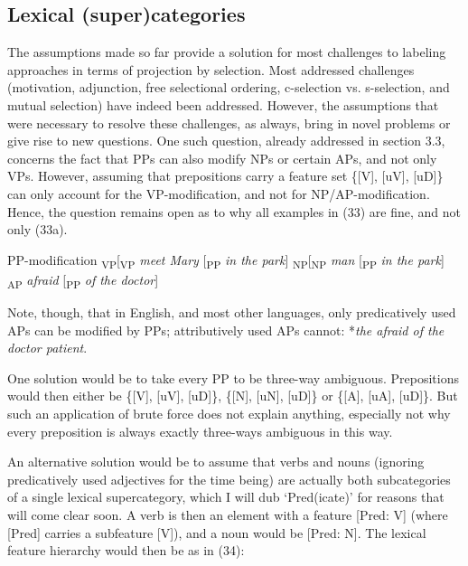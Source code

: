 \documentclass[output=paper
,modfonts
,nonflat]{langsci/langscibook}
\begin{document}
\subsection{Lexical (super)categories}
The assumptions made so far provide a solution for most challenges to labeling approaches in terms of projection by selection. Most addressed challenges (motivation, adjunction, free selectional ordering, c-selection vs. s-selection, and mutual selection) have indeed been addressed. However, the assumptions that were necessary to resolve these challenges, as always, bring in novel problems or give rise to new questions. One such question, already addressed in section 3.3, concerns the fact that PPs can also modify NPs or certain APs, and not only VPs. However, assuming that prepositions carry a feature set \{[V], [uV], [uD]\} can only account for the VP-modification, and not for NP/AP-modification. Hence, the question remains open as to why all examples in (33) are fine, and not only (33a). 

\begin{exe}
\ex PP-modification
	\xlist
	\ex {\lbrack}\textsubscript{VP}[\textsubscript{VP} \textit{meet Mary} [\textsubscript{PP} \textit{in the park}]{\rbrack}
	\ex {\lbrack}\textsubscript{NP}[\textsubscript{NP} \textit{man} [\textsubscript{PP} \textit{in the park}]{\rbrack}
	\ex {\lbrack}\textsubscript{AP} \textit{afraid} [\textsubscript{PP} \textit{of the doctor}]{\rbrack}
	\endxlist
\end{exe}
Note, though, that in English, and most other languages, only predicatively used APs can be modified by PPs; attributively used APs cannot: *\textit{the afraid of the doctor patient}.

One solution would be to take every PP to be three-way ambiguous. Prepositions would then either be \{[V], [uV], [uD]\}, \{[N], [uN], [uD]\} or \{[A], [uA], [uD]\}. But such an application of brute force does not explain anything, especially not why every preposition is always exactly three-ways ambiguous in this way.

An alternative solution would be to assume that verbs and nouns (ignoring predicatively used adjectives for the time being) are actually both subcategories of a single lexical supercategory, which I will dub ‘Pred(icate)’ for reasons that will come clear soon. A verb is then an element with a feature [Pred: V] (where [Pred] carries a subfeature [V]), and a noun would be [Pred: N]. The lexical feature hierarchy would then be as in (34):
\end{document}
